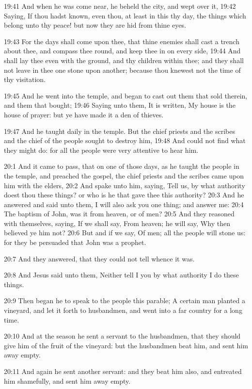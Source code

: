 19:41 And when he was come near, he beheld the city, and wept over it, 19:42 Saying, If thou hadst known, even thou, at least in this thy day, the things which belong unto thy peace! but now they are hid from thine eyes.

19:43 For the days shall come upon thee, that thine enemies shall cast a trench about thee, and compass thee round, and keep thee in on every side, 19:44 And shall lay thee even with the ground, and thy children within thee; and they shall not leave in thee one stone upon another; because thou knewest not the time of thy visitation.

19:45 And he went into the temple, and began to cast out them that sold therein, and them that bought; 19:46 Saying unto them, It is written, My house is the house of prayer: but ye have made it a den of thieves.

19:47 And he taught daily in the temple. But the chief priests and the scribes and the chief of the people sought to destroy him, 19:48 And could not find what they might do: for all the people were very attentive to hear him.

20:1 And it came to pass, that on one of those days, as he taught the people in the temple, and preached the gospel, the chief priests and the scribes came upon him with the elders, 20:2 And spake unto him, saying, Tell us, by what authority doest thou these things? or who is he that gave thee this authority?  20:3 And he answered and said unto them, I will also ask you one thing; and answer me: 20:4 The baptism of John, was it from heaven, or of men?  20:5 And they reasoned with themselves, saying, If we shall say, From heaven; he will say, Why then believed ye him not?  20:6 But and if we say, Of men; all the people will stone us: for they be persuaded that John was a prophet.

20:7 And they answered, that they could not tell whence it was.

20:8 And Jesus said unto them, Neither tell I you by what authority I do these things.

20:9 Then began he to speak to the people this parable; A certain man planted a vineyard, and let it forth to husbandmen, and went into a far country for a long time.

20:10 And at the season he sent a servant to the husbandmen, that they should give him of the fruit of the vineyard: but the husbandmen beat him, and sent him away empty.

20:11 And again he sent another servant: and they beat him also, and entreated him shamefully, and sent him away empty.

